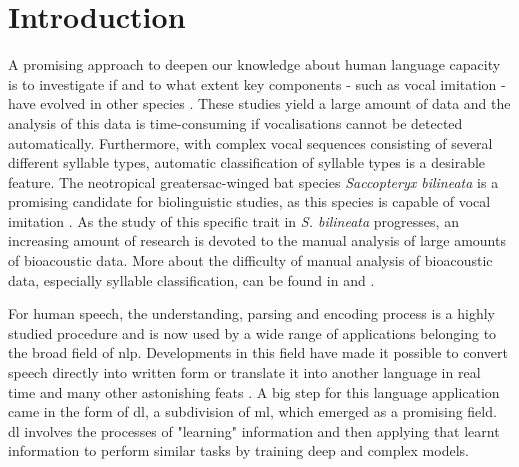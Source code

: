 \chapter{Introduction}
\label{ch:introduction}
A promising approach to deepen our knowledge about human language capacity is to investigate if and to what extent key components - such as vocal imitation - have evolved in other species \cite{Vernes2020}. 
These studies yield a large amount of data and the analysis of this data is time-consuming if vocalisations cannot be detected automatically. Furthermore, with complex vocal sequences consisting of several different syllable types, automatic classification of syllable types is a desirable feature.
The neotropical greatersac-winged bat species \emph{Saccopteryx bilineata} is a promising candidate for biolinguistic studies, as this species is capable of vocal imitation \cite{Knornschild2014}. 
As the study of this specific trait in \emph{S. bilineata} progresses, an increasing amount of research is devoted to the manual analysis of large amounts of bioacoustic data. More about the difficulty of manual analysis of bioacoustic data, especially syllable classification, can be found in  and .

For human speech, the understanding, parsing and encoding process is a highly studied procedure and is now used by a wide range of applications belonging to the broad field of \gls{nlp}.
Developments in this field have made it possible to convert speech directly into written form or translate it into another language in real time and many other astonishing feats \cite{Kang2020NaturalReview}. A big step for this language application came in the form of \gls{dl}, a subdivision of \gls{ml}, which emerged as a promising field.
\Gls{dl} involves the processes of "learning" information and then applying that learnt information to perform similar tasks by training deep and complex models.

